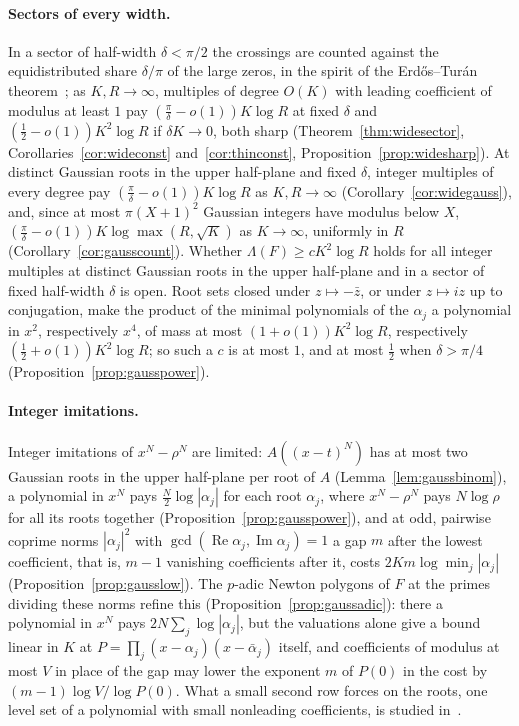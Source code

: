 \documentclass[11pt]{article}
\begin{document}
\paragraph{Sectors of every width.}  In a sector of half-width
$\delta<\pi/2$ the crossings are counted against the equidistributed share
$\delta/\pi$ of the large zeros, in the spirit of the Erd\H{o}s--Tur\'an
theorem~\cite{erdos-turan}; as $K,R\to\infty$, multiples of degree $O(K)$
with leading coefficient of modulus at least $1$ pay
$(\frac\pi\delta-o(1))K\log R$ at fixed $\delta$ and
$(\frac12-o(1))K^2\log R$ if $\delta K\to0$, both sharp
(Theorem~\ref{thm:widesector}, Corollaries~\ref{cor:wideconst}
and~\ref{cor:thinconst}, Proposition~\ref{prop:widesharp}).  At distinct
Gaussian roots in the upper half-plane and fixed $\delta$, integer
multiples of every degree pay $(\frac\pi\delta-o(1))K\log R$ as
$K,R\to\infty$ (Corollary~\ref{cor:widegauss}), and, since at most
$\pi(X+1)^2$ Gaussian integers have modulus below $X$,
$(\frac\pi\delta-o(1))K\log\max(R,\sqrt K)$ as $K\to\infty$, uniformly in
$R$ (Corollary~\ref{cor:gausscount}).  Whether $\Lambda(F)\ge cK^2\log R$
holds for all integer multiples at distinct Gaussian roots in the upper
half-plane and in a sector of fixed half-width $\delta$ is open.  Root sets
closed under $z\mapsto-\bar z$, or under $z\mapsto iz$ up to conjugation, make
the product of the minimal polynomials of the $\alpha_j$ a polynomial in $x^2$,
respectively $x^4$, of mass at most $(1+o(1))K^2\log R$, respectively
$(\frac12+o(1))K^2\log R$; so such a $c$ is at most $1$, and at most
$\frac12$ when $\delta>\pi/4$ (Proposition~\ref{prop:gausspower}).

\paragraph{Integer imitations.}  Integer imitations of $x^N-\rho^N$ are
limited: $A((x-t)^N)$ has at most two Gaussian roots in the upper
half-plane per root of $A$ (Lemma~\ref{lem:gaussbinom}), a polynomial in $x^N$
pays $\frac N2\log|\alpha_j|$ for each root $\alpha_j$, where $x^N-\rho^N$ pays
$N\log\rho$ for all its roots together (Proposition~\ref{prop:gausspower}),
and at odd,
pairwise coprime norms $|\alpha_j|^2$ with
$\gcd(\operatorname{Re}\alpha_j,\operatorname{Im}\alpha_j)=1$ a gap $m$ after
the lowest coefficient, that is, $m-1$ vanishing coefficients after it,
costs $2Km\log\min_j|\alpha_j|$ (Proposition~\ref{prop:gausslow}).  The
$p$-adic Newton polygons of $F$ at the primes dividing these norms refine
this (Proposition~\ref{prop:gaussadic}): there a polynomial in $x^N$ pays
$2N\sum_j\log|\alpha_j|$, but the valuations alone give a bound linear in $K$
at $P=\prod_j(x-\alpha_j)(x-\bar\alpha_j)$ itself, and coefficients of
modulus at most $V$ in place of the gap may lower the exponent $m$ of
$P(0)$ in the cost by $(m-1)\log V/\log P(0)$.  What a small second row
forces on the roots, one level set of a polynomial with small nonleading
coefficients, is studied in~\cite{coefficient-mass-levelsets}.
\end{document}
